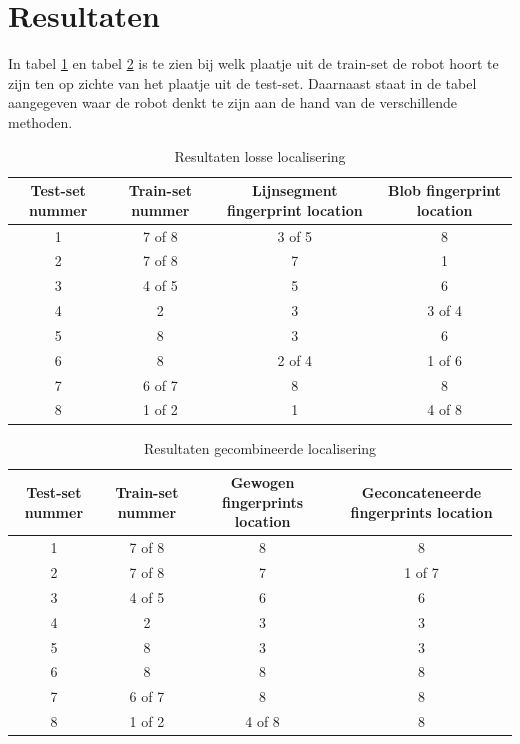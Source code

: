 \documentclass[a4paper]{article}
\begin{document}
\section{Resultaten}
In tabel \ref{tab:normal} en tabel \ref{tab:combo} is te zien bij welk plaatje uit de train-set de robot hoort te zijn ten op zichte van het plaatje uit de test-set. Daarnaast staat in de tabel aangegeven waar de robot denkt te zijn aan de hand van de verschillende methoden.
\begin{table}[h]
  \centering
  \begin{tabular}{| c | c | c | c |}
    \hline
    Test-set nummer & Train-set nummer &  Lijnsegment fingerprint location &  Blob fingerprint location\\ \hline
    1 & 7 of 8 & 3 of 5 & 8\\ \hline
    2 & 7 of 8 & 7 & 1\\ \hline
    3 & 4 of 5 & 5 & 6\\ \hline
    4 & 2 & 3 & 3 of 4\\\hline
    5 & 8 & 3 &  6 \\\hline
    6 & 8 & 2 of 4 & 1 of 6\\ \hline
    7 & 6 of 7 & 8 & 8\\ \hline
    8 & 1 of 2 & 1 & 4 of 8\\ \hline
  \end{tabular}
  \caption{Resultaten losse localisering}
  \label{tab:normal}
\end{table}

\begin{table}[h]
  \centering
  \begin{tabular}{| c | c | c | c |}
    \hline
    Test-set nummer & Train-set nummer &  Gewogen fingerprints location &  Geconcateneerde fingerprints location\\ \hline
    1 & 7 of 8 &  8 & 8\\ \hline
    2 & 7 of 8 &  7 & 1 of 7\\ \hline
    3 & 4 of 5 &  6& 6\\ \hline
    4 & 2 &  3 & 3\\ \hline
    5 & 8 &  3 & 3  \\ \hline
    6 & 8 & 8 & 8\\ \hline
    7 & 6 of 7 & 8 & 8 \\ \hline
    8 & 1 of 2 & 4 of 8 & 8\\ \hline
  \end{tabular}
  \caption{Resultaten gecombineerde localisering}
  \label{tab:combo}
\end{table}
\end{document}
